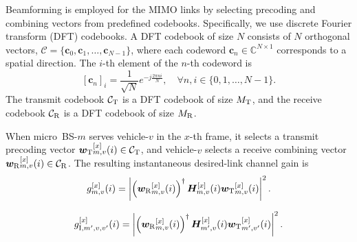 \documentclass[10pt,journal,letterpaper]{journal_template/IEEEtran}
\newcommand{\rev}[1]{\textcolor{revisioncolor}{{}#1}}
\newif\ifshowdeletions
\newcommand{\currentdel}[1]{\ifshowdeletions\textcolor{deletioncolor}{\sout{#1}}\fi}
\theoremstyle{remark}
\begin{document}
Beamforming is employed for the MIMO links by selecting precoding and combining vectors from predefined codebooks. 
Specifically, we use discrete Fourier transform (DFT) codebooks. A DFT codebook of size $N$ consists of $N$ orthogonal vectors, $\mathcal{C} = \{\boldsymbol{c}_0, \boldsymbol{c}_1, \dots, \boldsymbol{c}_{N-1}\}$, where each codeword $\boldsymbol{c}_n \in \mathbb{C}^{N \times 1}$ corresponds to a spatial direction. The $i$-th element of the $n$-th codeword is
\begin{equation}
\label{eq:dft_codebook}
    [\boldsymbol{c}_n]_i = \frac{1}{\sqrt{N}} e^{-j \frac{2\pi ni}{N}}, \quad \forall n, i \in \{0, 1, \dots, N-1\}.
\end{equation}
The transmit codebook $\mathcal{C}_{\rm T}$ is a DFT codebook of size $M_{\rm T}$, and the receive codebook $\mathcal{C}_{\rm R}$ is a DFT codebook of size $M_{\rm R}$. 

When micro~BS-$m$ serves vehicle-$v$ in the $x$-th frame, it selects a transmit precoding vector ${\bm{w}_{\rm T}}_{m,v}^{[x]}(i) \in \mathcal{C}_{\rm T}$, and vehicle-$v$ selects a receive combining vector ${\bm{w}_{\rm R}}_{m,v}^{[x]}(i) \in \mathcal{C}_{\rm R}$. The resulting
instantaneous {desired-link} channel gain is
\begin{equation}
\label{eq:mimo_instant_gain}
    g_{m,v}^{[x]}(i) = \left| \left({\bm{w}_{\rm R}}_{m,v}^{[x]}(i)\right)^{\dagger} \boldsymbol{H}_{m,v}^{[x]}(i) {\bm{w}_{\rm T}}_{m,v}^{[x]} (i)\right|^2.
\end{equation}
\currentdel{For an interfering micro BS-$m$ that does not serve vehicle-$v$, we do not explicitly model its beam pattern toward vehicle-$v$. Instead, the corresponding interference-link channel gain is approximated by the Frobenius norm–based average gain of the MIMO channel matrix:}
\ifshowdeletions
\begin{equation*}
    \currentdel{\ensuremath{g_{{\rm I},m,v}^{[x]}(i)\triangleq
    \frac{1}{M_{\rm T}M_{\rm R}}\bigl\|\boldsymbol H_{m,v}^{[x]}(i)\bigr\|_F^2,}}
\end{equation*}
\fi
{\color{revisioncolor}
\begin{equation}
\label{eq:mimo_instant_gain_interference}
    g_{{\rm I},m',v,v'}^{[x]}(i)
    = \left|\left({\bm{w}_{\rm R}}_{m,v}^{[x]}(i)\right)^{\dagger}
    \boldsymbol{H}_{m',v}^{[x]}(i){\bm{w}_{\rm T}}_{m',v'}^{[x]}(i)\right|^2.
\end{equation}
}
\currentdel{which provides a simple approximation of the effective interference power under random transmit and receive beam directions.}
\end{document}
